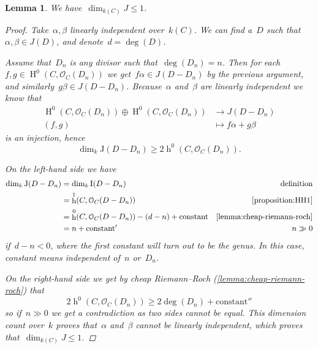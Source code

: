 \documentclass[10pt,a4paper]{article}
\theoremstyle{lecture}
\newtheorem{lemma}[theorem]{Lemma}
\DeclareMathOperator\hh{h}
\DeclareMathOperator\HH{H}
\begin{document}
\begin{lemma}
  \label{lemma:dim-J-1}
  We have~$\dim_{k(C)}J\leq 1$.
  \begin{proof}
    Take~$\alpha,\beta$ linearly independent over~$k(C)$. We can find a~$D$ such that~$\alpha,\beta\in J(D)$, and denote~$d=\deg(D)$.

    Assume that~$D_n$ is any divisor such that~$\deg(D_n)=n$. Then for each~$f,g\in\HH^0(C,\mathcal{O}_C(D_n))$ we get~$f\alpha\in J(D-D_n)$ by the previous argument, and similarly~$g\beta\in J(D-D_n)$. Because~$\alpha$ and~$\beta$ are linearly independent we know that
    \begin{equation}
      \begin{aligned}
        \HH^0(C,\mathcal{O}_C(D_n))\oplus\HH^0(C,\mathcal{O}_C(D_n))&\to J(D-D_n) \\
        (f,g)&\mapsto f\alpha+g\beta
      \end{aligned}
    \end{equation}
    is an injection, hence
    \begin{equation}
      \dim_k\mathrm{J}(D-D_n)\geq 2\hh^0(C,\mathcal{O}_C(D_n)).
    \end{equation}

    On the left-hand side we have
    \begin{equation}
      \begin{aligned}
        \dim_k\mathrm{J}(D-D_n)&=\dim_k\mathrm{I}(D-D_n) & \text{definition} \\
        &=\hh^1(C,\mathcal{O}_C(D-D_n)) & \text{\cref{proposition:HH1}} \\
        &=\hh^0(C,\mathcal{O}_C(D-D_n))-(d-n)+\text{constant} & \text{\cref{lemma:cheap-riemann-roch}} \\
        &=n+\text{constant}' & n\gg 0
      \end{aligned}
    \end{equation}
    if~$d-n<0$, where the first constant will turn out to be the genus. In this case, constant means independent of~$n$ or~$D_n$.

    On the right-hand side we get by cheap Riemann--Roch (\cref{lemma:cheap-riemann-roch}) that
    \begin{equation}
      2\hh^0(C,\mathcal{O}_C(D_n))\geq 2\deg(D_n)+\text{constant}''
    \end{equation}
    so if~$n\gg 0$ we get a contradiction as two sides cannot be equal. This dimension count over~$k$ proves that~$\alpha$ and~$\beta$ cannot be linearly independent, which proves that~$\dim_{k(C)}J\leq 1$.
  \end{proof}
\end{lemma}
\end{document}
